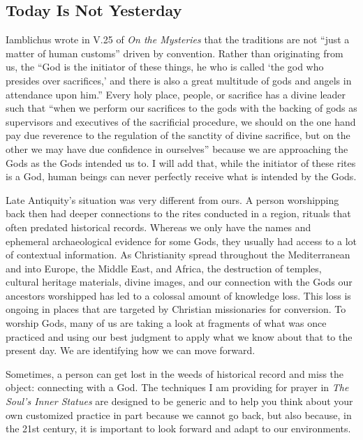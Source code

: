 \documentclass[
]{book}
\begin{document}
\hypertarget{today-is-not-yesterday}{%
\subsection{Today Is Not Yesterday}\label{today-is-not-yesterday}}

Iamblichus wrote in V.25 of \emph{On the Mysteries} that the traditions are not ``just a matter of human customs'' driven by convention. Rather than originating from us, the ``God is the initiator of these things, he who is called `the god who presides over sacrifices,' and there is also a great multitude of gods and angels in attendance upon him.'' Every holy place, people, or sacrifice has a divine leader such that ``when we perform our sacrifices to the gods with the backing of gods as supervisors and executives of the sacrificial procedure, we should on the one hand pay due reverence to the regulation of the sanctity of divine sacrifice, but on the other we may have due confidence in ourselves'' because we are approaching the Gods as the Gods intended us to. I will add that, while the initiator of these rites is a God, human beings can never perfectly receive what is intended by the Gods.

Late Antiquity's situation was very different from ours. A person worshipping back then had deeper connections to the rites conducted in a region, rituals that often predated historical records. Whereas we only have the names and ephemeral archaeological evidence for some Gods, they usually had access to a lot of contextual information. As Christianity spread throughout the Mediterranean and into Europe, the Middle East, and Africa, the destruction of temples, cultural heritage materials, divine images, and our connection with the Gods our ancestors worshipped has led to a colossal amount of knowledge loss. This loss is ongoing in places that are targeted by Christian missionaries for conversion. To worship Gods, many of us are taking a look at fragments of what was once practiced and using our best judgment to apply what we know about that to the present day. We are identifying how we can move forward.

Sometimes, a person can get lost in the weeds of historical record and miss the object: connecting with a God. The techniques I am providing for prayer in \emph{The Soul's Inner Statues} are designed to be generic and to help you think about your own customized practice in part because we cannot go back, but also because, in the 21st century, it is important to look forward and adapt to our environments.
\end{document}
